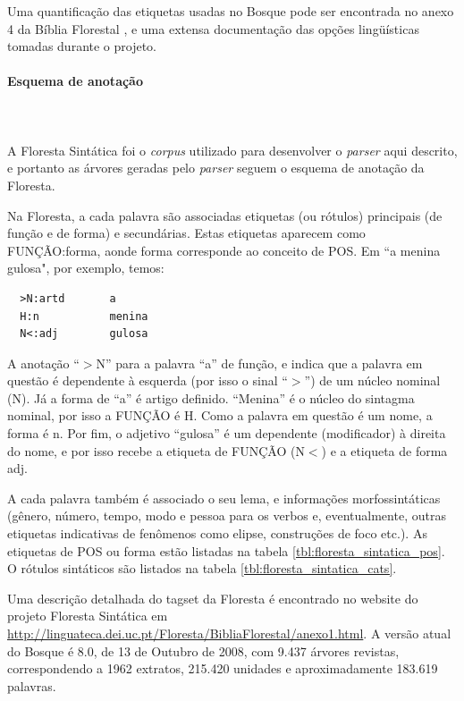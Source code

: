 Uma quantificação das etiquetas usadas no Bosque pode ser encontrada no anexo 4 da Bíblia Florestal \cite{florestasintatica}, e uma extensa documentação das opções lingüísticas tomadas durante o projeto.


\paragraph{Esquema de anotação}\label{par:corpus_bosque_esquema}\hspace*{1in}\\ \\

A Floresta Sintática foi o \emph{corpus} utilizado para desenvolver o \emph{parser} aqui descrito, e portanto as árvores geradas pelo \emph{parser} seguem o esquema de anotação da Floresta.

Na Floresta, a cada palavra são associadas etiquetas (ou rótulos) principais (de função e de forma) e secundárias. Estas etiquetas aparecem como FUNÇÃO:forma, aonde forma corresponde ao conceito de POS. Em ``a menina gulosa", por exemplo, temos:


\begin{verbatim}
  >N:artd       a
  H:n           menina
  N<:adj        gulosa
\end{verbatim}

A anotação ``$>$N'' para a palavra ``a'' de função, e indica que a palavra em questão é dependente à esquerda (por isso o sinal ``$>$'') de um núcleo nominal (N). Já a forma de ``a'' é artigo definido. ``Menina'' é o núcleo do sintagma nominal, por isso a FUNÇÃO é H. Como a palavra em questão é um nome, a forma é n. Por fim, o adjetivo ``gulosa'' é um dependente (modificador) à direita do nome, e por isso recebe a etiqueta de FUNÇÃO (N$<$) e a etiqueta de forma adj.

A cada palavra também é associado o seu lema, e informações morfossintáticas (gênero, número, tempo, modo e pessoa para os verbos e, eventualmente, outras etiquetas indicativas de fenômenos como elipse, construções de foco etc.). As etiquetas de POS ou forma estão listadas na tabela \ref{tbl:floresta_sintatica_pos}. O rótulos sintáticos são listados na tabela \ref{tbl:floresta_sintatica_cats}.

Uma descrição detalhada do tagset da Floresta é encontrado no website do projeto Floresta Sintática em \url{http://linguateca.dei.uc.pt/Floresta/BibliaFlorestal/anexo1.html}. A versão atual do Bosque é 8.0, de 13 de Outubro de 2008, com 9.437 árvores revistas, correspondendo a 1962 extratos, 215.420 unidades e aproximadamente 183.619 palavras.

